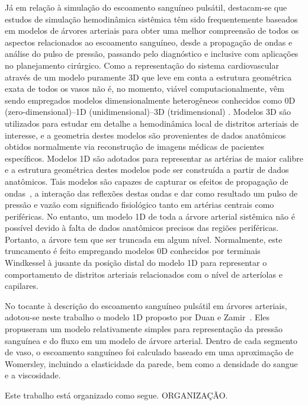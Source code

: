 \documentclass[
        english,			
        brazil			        %
        ,<...>]{abntbibufjf}
\begin{document}
Já em relação à simulação do escoamento sanguíneo pulsátil, destacam-se que estudos de simulação hemodinâmica sistêmica têm sido frequentemente baseados em modelos de árvores arteriais para obter uma melhor compreensão de todos os aspectos relacionados ao escoamento sanguíneo, desde a propagação de ondas e análise do pulso de pressão, passando pelo diagnóstico e inclusive com aplicações no planejamento cirúrgico. Como a representação do sistema cardiovascular através de um modelo puramente 3D que leve em conta a estrutura geométrica exata de todos os vasos não é, no momento, viável computacionalmente, vêm sendo empregados modelos dimensionalmente heterogêneos conhecidos como 0D (zero-dimensional)--1D (unidimensional)--3D (tridimensional) \cite{Blanco2008,Formaggia2001,Urquiza2006}. Modelos 3D \cite{Peskin1972,Taylor1998} são utilizados para estudar em detalhe a hemodinâmica local de distritos arteriais de interesse, e a geometria destes modelos são provenientes de dados anatômicos obtidos normalmente via reconstrução de imagens médicas de pacientes específicos. Modelos 1D \cite{Avolio,Formaggia2003,Stergiopulos1992} são adotados para representar as artérias de maior calibre e a estrutura geométrica destes modelos pode ser construída a partir de dados anatômicos. Tais modelos são capazes de capturar os efeitos de propagação de ondas~\cite{Anliker1971,Duan}, a interação das reflexões destas ondas e dar como resultado um pulso de pressão e vazão com significado fisiológico tanto em artérias centrais como periféricas. No entanto, um modelo 1D de toda a árvore arterial sistêmica não é possível devido à falta de dados anatômicos precisos das regiões periféricas. Portanto, a árvore tem que ser truncada em algum nível. Normalmente, este truncamento é feito empregando modelos 0D \cite{Mates1988,Stergiopulos1992} conhecidos por terminais Windkessel à jusante da posição distal do modelo 1D para representar o comportamento de distritos arteriais relacionados com o nível de arteríolas e capilares. 

No tocante à descrição do escoamento sanguíneo pulsátil em árvores arteriais, adotou-se neste trabalho o modelo 1D proposto por Duan e Zamir~\cite{Duan}. Eles propuseram um modelo relativamente simples para representação da pressão sanguínea e do fluxo em um modelo de árvore arterial. Dentro de cada segmento de vaso, o escoamento sanguíneo foi calculado baseado em uma aproximação de Womersley, incluindo a elasticidade da parede, bem como a densidade do sangue e a viscosidade.

Este trabalho está organizado como segue. ORGANIZAÇÃO.
\end{document}
